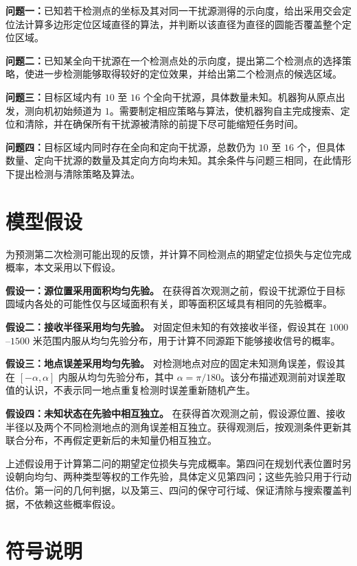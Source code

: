 \documentclass[UTF8,a4paper,zihao=-4,fontset=none]{ctexart}
\begin{document}
\textbf{问题一：}已知若干检测点的坐标及其对同一干扰源测得的示向度，给出采用交会定位法计算多边形定位区域直径的算法，并判断以该直径为直径的圆能否覆盖整个定位区域。

\textbf{问题二：}已知某全向干扰源在一个检测点处的示向度，提出第二个检测点的选择策略，使进一步检测能够取得较好的定位效果，并给出第二个检测点的候选区域。

\textbf{问题三：}目标区域内有 \(10\) 至 \(16\) 个全向干扰源，具体数量未知。机器狗从原点出发，测向机初始频道为 \(1\)。需要制定相应策略与算法，使机器狗自主完成搜索、定位和清除，并在确保所有干扰源被清除的前提下尽可能缩短任务时间。

\textbf{问题四：}目标区域内同时存在全向和定向干扰源，总数仍为 \(10\) 至 \(16\) 个，但具体数量、定向干扰源的数量及其定向方向均未知。其余条件与问题三相同，在此情形下提出检测与清除策略及算法。


\section{模型假设}

为预测第二次检测可能出现的反馈，并计算不同检测点的期望定位损失与定位完成概率，本文采用以下假设。

\textbf{假设一：源位置采用面积均匀先验。} 在获得首次观测之前，假设干扰源位于目标圆域内各处的可能性仅与区域面积有关，即等面积区域具有相同的先验概率。

\textbf{假设二：接收半径采用均匀先验。} 对固定但未知的有效接收半径，假设其在 \(1000\)--\(1500\) 米范围内服从均匀先验分布，用于计算不同源距下能够接收信号的概率。

\textbf{假设三：地点误差采用均匀先验。} 对检测地点对应的固定未知测角误差，假设其在 \([-\alpha,\alpha]\) 内服从均匀先验分布，其中 \(\alpha=\pi/180\)。该分布描述观测前对误差取值的认识，不表示同一地点重复检测时误差重新随机产生。

\textbf{假设四：未知状态在先验中相互独立。} 在获得首次观测之前，假设源位置、接收半径以及两个不同检测地点的测角误差相互独立。获得观测后，按观测条件更新其联合分布，不再假定更新后的未知量仍相互独立。

上述假设用于计算第二问的期望定位损失与完成概率。第四问在规划代表位置时另设朝向均匀、两种类型等权的工作先验，具体定义见第四问；这些先验只用于行动估价。第一问的几何判据，以及第三、四问的保守可行域、保证清除与搜索覆盖判据，不依赖这些概率假设。

\section{符号说明}
\end{document}
